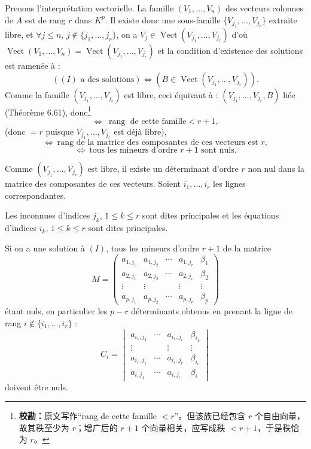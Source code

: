 Prenons l'interprétation vectorielle. La famille $(V_1,\ldots,V_n)$ des vecteurs colonnes de $A$ est de rang $r$ dans $K^p$. Il existe donc une sous-famille $\{V_{j_1},\ldots,V_{j_r}\}$ extraite libre, et $\forall j\le n$, $j\notin\{j_1,\ldots,j_r\}$, on a $V_j\in\operatorname{Vect}(V_{j_1},\ldots,V_{j_r})$ d'où $\operatorname{Vect}(V_1,\ldots,V_n)=\operatorname{Vect}(V_{j_1},\ldots,V_{j_r})$ et la condition d'existence des solutions est ramenée à :
\[
((I)\text{ a des solutions})\Longleftrightarrow(B\in\operatorname{Vect}(V_{j_1},\ldots,V_{j_r})).
\]
Comme la famille $(V_{j_1},\ldots,V_{j_r})$ est libre, ceci équivaut à : $(V_{j_1},\ldots,V_{j_r},B)$ liée (Théorème 6.61), donc\footnote{\textbf{校勘：}原文写作“rang de cette famille $<r$”。但该族已经包含 $r$ 个自由向量，故其秩至少为 $r$；增广后的 $r+1$ 个向量相关，应写成秩 $<r+1$，于是秩恰为 $r$。}
\[
\Longleftrightarrow\ \operatorname{rang}\text{ de cette famille}<r+1,
\]
(donc $=r$ puisque $V_{j_1},\ldots,V_{j_r}$ est déjà libre),
\[
\Longleftrightarrow\ \text{rang de la matrice des composantes de ces vecteurs est }r,
\]
\[
\Longleftrightarrow\ \text{tous les mineurs d'ordre }r+1\text{ sont nuls.}
\]

Comme $(V_{j_1},\ldots,V_{j_r})$ est libre, il existe un déterminant d'ordre $r$ non nul dans la matrice des composantes de ces vecteurs. Soient $i_1,\ldots,i_r$ les lignes correspondantes.

Les inconnues d'indices $j_k$, $1\le k\le r$ sont dites principales et les équations d'indices $i_k$, $1\le k\le r$ sont dites principales.

Si on a une solution à $(I)$, tous les mineurs d'ordre $r+1$ de la matrice
\[
M=\begin{pmatrix}
a_{1,j_1}&a_{1,j_2}&\cdots&a_{1,j_r}&\beta_1\\
a_{2,j_1}&a_{2,j_2}&\cdots&a_{2,j_r}&\beta_2\\
\vdots&\vdots&&\vdots&\vdots\\
a_{p,j_1}&a_{p,j_2}&\cdots&a_{p,j_r}&\beta_p
\end{pmatrix}
\]
étant nuls, en particulier les $p-r$ déterminants obtenus en prenant la ligne de rang $i\notin\{i_1,\ldots,i_r\}$ :
\[
C_i=\begin{vmatrix}
a_{i_1,j_1}&\cdots&a_{i_1,j_r}&\beta_{i_1}\\
\vdots&&\vdots&\vdots\\
a_{i_r,j_1}&\cdots&a_{i_r,j_r}&\beta_{i_r}\\
a_{i,j_1}&\cdots&a_{i,j_r}&\beta_i
\end{vmatrix}
\]
doivent être nuls.

